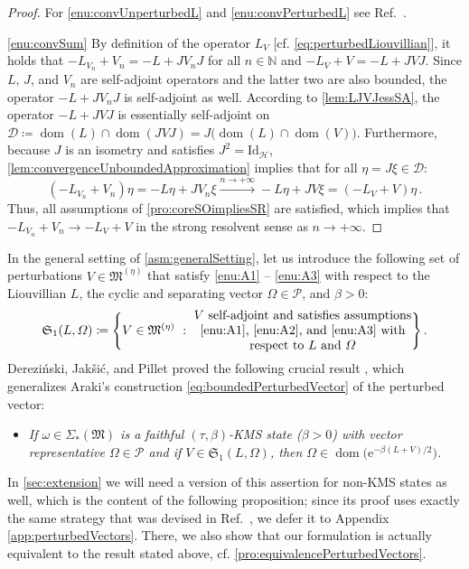 \documentclass[a4paper, twoside, 11pt, reqno]{amsart}
\theoremstyle{definition}
\theoremstyle{plain}
\let\originalleft\left
\let\originalright\right
\renewcommand{\left}{\mathopen{}\mathclose\bgroup\originalleft}
\renewcommand{\right}{\aftergroup\egroup\originalright}
\renewcommand{\Sigma}{\varSigma}
\renewcommand{\Omega}{\varOmega}
\newcommand{\N}{\mathbb{N}}
\newcommand{\MD}{\mathcal{D}}
\newcommand{\MH}{\mathcal{H}}
\newcommand{\MFM}{\mathfrak{M}}
\newcommand{\MFS}{\mathfrak{S}}
\newcommand{\ee}{\mathrm{e}}
\newcommand{\NS}[1]{\Sigma_{\ast}(#1)}
\newcommand{\NPC}{\mathcal{P}}
\renewcommand{\AE}[1]{#1^{(\eta)}}
\newcommand{\id}{\mathrm{Id}}
\newcommand{\1}{\mathbf{1}}
\DeclareMathOperator{\dom}{dom}
\newcommand{\ce}{\coloneqq}
\begin{document}
\begin{proof}
    For \ref{enu:convUnperturbedL} and \ref{enu:convPerturbedL} see Ref.~\cite[Thm. 5.6]{DJP03}.

    \ref{enu:convSum} By definition of the operator $L_V$ [cf. \cref{eq:perturbedLiouvillian}], it holds that $- L_{V_n} + V_n = - L + J V_n J$ for all $n \in \N$ and $- L_V + V = - L + J V J$. Since $L$, $J$, and $V_n$ are self-adjoint operators and the latter two are also bounded, the operator $- L + J V_n J$ is self-adjoint as well. According to \cref{lem:LJVJessSA}, the operator $- L + J V J$ is essentially self-adjoint on $\MD \ce \dom(L) \cap \dom(J V J) = J \bigl(\dom(L) \cap \dom(V)\bigr)$. Furthermore, because $J$ is an isometry and satisfies $J^2 = \id_\MH$, \cref{lem:convergenceUnboundedApproximation} implies that for all $\eta = J \xi \in \MD$:
    \begin{equation*}
        (- L_{V_n} + V_n) \eta = - L \eta + J V_n \xi \xrightarrow{n \to + \infty} - L \eta + J V \xi = (- L_V + V) \eta \, .
    \end{equation*}
    Thus, all assumptions of \cref{pro:coreSOimpliesSR} are satisfied, which implies that $- L_{V_n} + V_n \to - L_V + V$ in the strong resolvent sense as $n \to + \infty$.
\end{proof}

In the general setting of \cref{asm:generalSetting}, let us introduce the following set of perturbations $V \in \AE{\MFM}$ that satisfy \ref{enu:A1} -- \ref{enu:A3} with respect to the Liouvillian $L$, the cyclic and separating vector $\Omega \in \NPC$, and $\beta > 0$:
\begin{equation*}
    \MFS_1(L, \Omega) \ce \left\{V \in \AE{\MFM} \ : \ \parbox{0.5\textwidth}{\centering $V$ self-adjoint and satisfies assumptions \ref{enu:A1}, \ref{enu:A2}, and \ref{enu:A3} with respect to $L$ and $\Omega$}\right\} \, .
\end{equation*}
Derezi\'{n}ski, Jak\v{s}i\'{c}, and Pillet proved the following crucial result \cite[Thm. 5.5 (1)]{DJP03}, which generalizes Araki's construction \eqref{eq:boundedPerturbedVector} of the perturbed vector:
\begin{itemize}
    \item \itshape If $\omega \in \NS{\MFM}$ is a faithful $(\tau, \beta)$-KMS state ($\beta > 0$) with vector representative $\Omega \in \NPC$ and if $V \in \MFS_1(L, \Omega)$, then $\Omega \in \dom \bigl(\ee^{- \beta (L + V) / 2}\bigr)$.
\end{itemize}
In \cref{sec:extension} we will need a version of this assertion for non-KMS states as well, which is the content of the following proposition; since its proof uses exactly the same strategy that was devised in Ref.~\cite{DJP03}, we defer it to Appendix \ref{app:perturbedVectors}. There, we also show that our formulation is actually equivalent to the result stated above, cf. \cref{pro:equivalencePerturbedVectors}.
\end{document}
